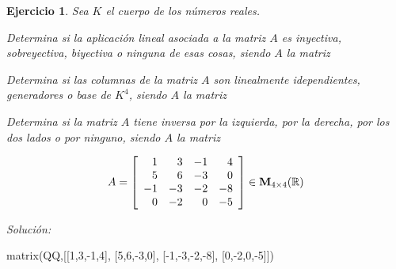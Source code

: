 \documentclass[12pt]{amsart}
\newtheorem{ejer}{Ejercicio}
\begin{document}
\begin{ejer} Sea $K$ el cuerpo de los n\'umeros reales.
\newline
\noindent\begin{minipage}{\textwidth}
\begin{tcolorbox}[colback = green!20!white,title=Versión Aplicaciones]
Determina si la aplicaci\'on lineal asociada a la matriz $A$ es inyectiva, sobreyectiva, biyectiva o ninguna de esas cosas, siendo $A$ la matriz \end{tcolorbox}
\end{minipage} \newline
\noindent\begin{minipage}{\textwidth}
\begin{tcolorbox}[colback = blue!20!white,title=Versión Vectores]
Determina si las columnas de la matriz $A$ son linealmente idependientes, generadores o base de $K^{4}$, siendo $A$ la matriz \end{tcolorbox}
\end{minipage} \newline
\noindent\begin{minipage}{\textwidth} 
\begin{tcolorbox}[colback = red!20!white,title=Versión Inversas]
Determina si la matriz $A$ tiene inversa por la izquierda, por la derecha, por los dos lados o por ninguno, siendo $A$ la matriz 
\end{tcolorbox}
\end{minipage}
\[ A = \left[\begin{array}{rrrr}
1 & 3 & -1 & 4 \\
5 & 6 & -3 & 0 \\
-1 & -3 & -2 & -8 \\
0 & -2 & 0 & -5
\end{array}\right] \in {\bf M}_{4\times 4}({\mathbb R})\]
\end{ejer}

{\it Soluci\'on:}

\begin{sageblock}
matrix(QQ,[[1,3,-1,4],
[5,6,-3,0],
[-1,-3,-2,-8],
[0,-2,0,-5]])
\end{sageblock}

\end{document}
